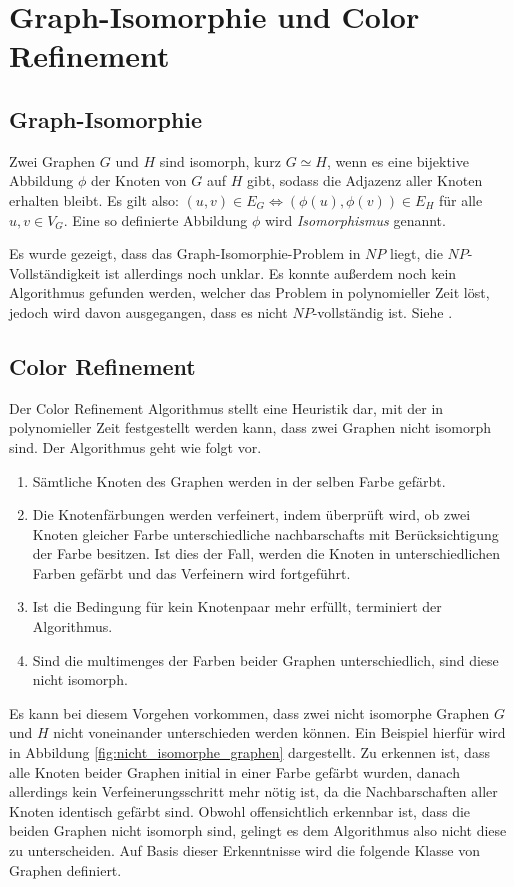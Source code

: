 \section{Graph-Isomorphie und Color Refinement}
\label{sec/gi_cr}

\subsection{Graph-Isomorphie}
Zwei Graphen $G$ und $H$ sind isomorph, kurz $G\simeq H$, wenn es eine bijektive Abbildung $\phi$ der Knoten von $G$ auf $H$ gibt, sodass die Adjazenz aller Knoten erhalten bleibt.
Es gilt also: $(u,v)\in E_G\Leftrightarrow (\phi (u),\phi (v))\in E_H$ für alle $u,v\in V_G$.
Eine so definierte Abbildung $\phi$ wird \emph{Isomorphismus} genannt.

Es wurde gezeigt, dass das Graph-Isomorphie-Problem in $NP$ liegt, die $NP$-Vollständigkeit ist allerdings noch unklar.
Es konnte außerdem noch kein Algorithmus gefunden werden, welcher das Problem in polynomieller Zeit löst, jedoch wird davon ausgegangen, dass es nicht $NP$-vollständig ist.
Siehe \cite{Goldreich1991}.

\subsection{Color Refinement}
Der Color Refinement Algorithmus stellt eine Heuristik dar, mit der in polynomieller Zeit festgestellt werden kann, dass zwei Graphen nicht isomorph sind.
Der Algorithmus geht wie folgt vor.
\begin{enumerate}
	\item Sämtliche Knoten des Graphen werden in der selben Farbe gefärbt.
	\item Die Knotenfärbungen werden verfeinert, indem überprüft wird, ob zwei Knoten gleicher Farbe unterschiedliche \glspl{nachbarschaft} mit Berücksichtigung der Farbe besitzen.
	Ist dies der Fall, werden die Knoten in unterschiedlichen Farben gefärbt und das Verfeinern wird fortgeführt.
	\item Ist die Bedingung für kein Knotenpaar mehr erfüllt, terminiert der Algorithmus.
	\item Sind die \glspl{multimenge} der Farben beider Graphen unterschiedlich, sind diese nicht isomorph.
\end{enumerate}

Es kann bei diesem Vorgehen vorkommen, dass zwei nicht isomorphe Graphen $G$ und $H$ nicht voneinander unterschieden werden können.
Ein Beispiel hierfür wird in Abbildung \ref{fig:nicht_isomorphe_graphen} dargestellt.
Zu erkennen ist, dass alle Knoten beider Graphen initial in einer Farbe gefärbt wurden, danach allerdings kein Verfeinerungsschritt mehr nötig ist, da die Nachbarschaften aller Knoten identisch gefärbt sind.
Obwohl offensichtlich erkennbar ist, dass die beiden Graphen nicht isomorph sind, gelingt es dem Algorithmus also nicht diese zu unterscheiden.
Auf Basis dieser Erkenntnisse wird die folgende Klasse von Graphen definiert.

